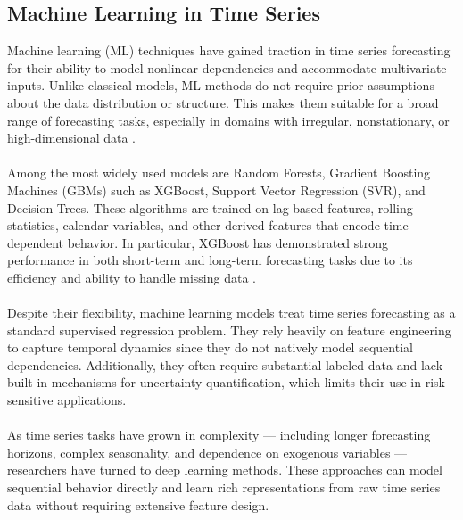 \documentclass{article}
\begin{document}
\subsection{Machine Learning in Time Series}
Machine learning (ML) techniques have gained traction in time series forecasting for their ability to model nonlinear dependencies and accommodate multivariate inputs. Unlike classical models, ML methods do not require prior assumptions about the data distribution or structure. This makes them suitable for a broad range of forecasting tasks, especially in domains with irregular, nonstationary, or high-dimensional data \cite{li2023survey,smith2023compare}.\\
\\
Among the most widely used models are Random Forests, Gradient Boosting Machines (GBMs) such as XGBoost, Support Vector Regression (SVR), and Decision Trees. These algorithms are trained on lag-based features, rolling statistics, calendar variables, and other derived features that encode time-dependent behavior. In particular, XGBoost has demonstrated strong performance in both short-term and long-term forecasting tasks due to its efficiency and ability to handle missing data \cite{li2023survey}.\\
\\
Despite their flexibility, machine learning models treat time series forecasting as a standard supervised regression problem. They rely heavily on feature engineering to capture temporal dynamics since they do not natively model sequential dependencies. Additionally, they often require substantial labeled data and lack built-in mechanisms for uncertainty quantification, which limits their use in risk-sensitive applications.\\
\\
As time series tasks have grown in complexity — including longer forecasting horizons, complex seasonality, and dependence on exogenous variables — researchers have turned to deep learning methods. These approaches can model sequential behavior directly and learn rich representations from raw time series data without requiring extensive feature design\cite{lim2020deep,benitez2021experimental}.
\end{document}
